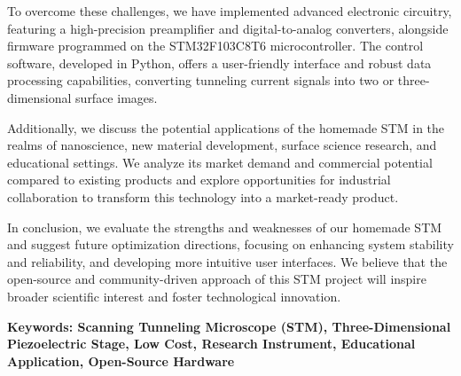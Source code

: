 \documentclass{article}
\begin{document}
\begin{spacing}{1.625}
\begin{adjustwidth}{0.42cm}{0.42cm}
		To overcome these challenges, we have implemented advanced electronic circuitry, featuring a high-precision preamplifier and digital-to-analog converters, alongside firmware programmed on the STM32F103C8T6 microcontroller. The control software, developed in Python, offers a user-friendly interface and robust data processing capabilities, converting tunneling current signals into two or three-dimensional surface images.
		
		Additionally, we discuss the potential applications of the homemade STM in the realms of nanoscience, new material development, surface science research, and educational settings. We analyze its market demand and commercial potential compared to existing products and explore opportunities for industrial collaboration to transform this technology into a market-ready product.
		
		In conclusion, we evaluate the strengths and weaknesses of our homemade STM and suggest future optimization directions, focusing on enhancing system stability and reliability, and developing more intuitive user interfaces. We believe that the open-source and community-driven approach of this STM project will inspire broader scientific interest and foster technological innovation.
		
		
		\textbf{Keywords: Scanning Tunneling Microscope (STM), Three-Dimensional Piezoelectric Stage, Low Cost, Research Instrument, Educational Application, Open-Source Hardware}
	\end{adjustwidth}


\clearpage
	\tableofcontents
	
	\clearpage
	{%
		\let\oldnumberline\numberline%
		\renewcommand{\numberline}{\figurename~\oldnumberline}%
		\listoffigures%
	}
	
	{%
		\let\oldnumberline\numberline%
		\renewcommand{\numberline}{\tablename~\oldnumberline}%
		\listoftables
	}


	

\end{spacing}
\end{document}
